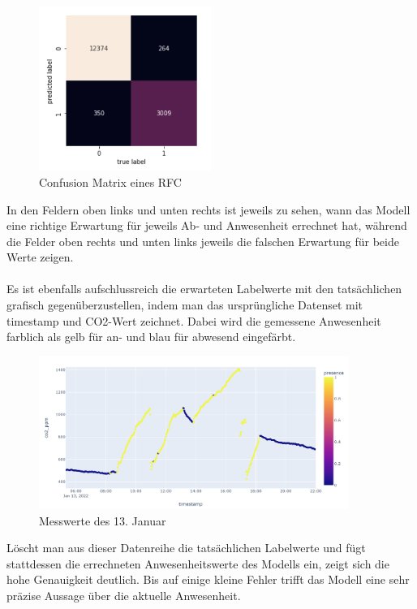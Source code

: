 \begin{figure}[h]
    \centering
    \includegraphics[width=0.5\textwidth]{pic/confusion_matrix.png}
    \caption{Confusion Matrix eines RFC}
    \label{fig:ConMatrix}
\end{figure}

In den Feldern oben links und unten rechts ist jeweils zu sehen, wann das Modell eine richtige Erwartung 
für jeweils Ab- und Anwesenheit errechnet hat, während die Felder oben rechts und unten links jeweils die falschen
Erwartung für beide Werte zeigen.\\\\

\newpage
Es ist ebenfalls aufschlussreich die erwarteten Labelwerte mit den tatsächlichen grafisch gegenüberzustellen, 
indem man das ursprüngliche Datenset mit timestamp und CO2-Wert zeichnet. Dabei wird die gemessene Anwesenheit 
farblich als gelb für an- und blau für abwesend eingefärbt.

\begin{figure}[h]
    \centering
    \includegraphics[width=0.9\textwidth]{pic/nov23_actual.png}
    \caption{Messwerte des 13. Januar}
    \label{fig:ConMatrix}
\end{figure}

Löscht man aus dieser Datenreihe die tatsächlichen Labelwerte und fügt stattdessen die errechneten 
Anwesenheitswerte des Modells ein, zeigt sich die hohe Genauigkeit deutlich. Bis auf einige kleine Fehler
trifft das Modell eine sehr präzise Aussage über die aktuelle Anwesenheit.

